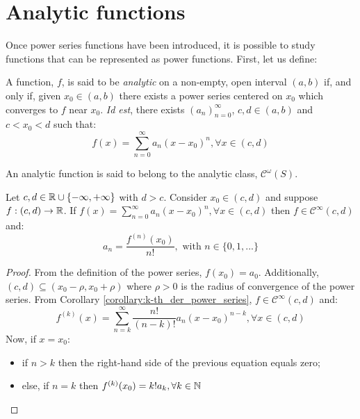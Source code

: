 \section{Analytic functions}

Once power series functions have been introduced, it is possible to study functions that can be represented as power functions. First, let us define:

\begin{definition}
    A function, $f$, is said to be \emph{analytic} on a non-empty, open interval $(a,b)$ if, and only if, given $x_0 \in (a,b)$ there exists a power series centered on $x_0$ which converges to $f$ near $x_0$. \emph{Id est}, there exists $(a_n)_{n=0}^\infty$, $c, d \in (a,b)$ and $c < x_0 < d$ such that:
    \begin{equation*}
        f(x) = \sum \limits_{n=0}^\infty a_n (x - x_0)^n, \forall x \in (c,d)
    \end{equation*}
\end{definition}

\begin{remark}
    An analytic function is said to belong to the analytic class, $\mathcal{C}^\omega(S)$.
\end{remark}

\begin{theorem}[Uniqueness]
    \label{theorem:uniqueness_power_series}
    Let $c, d \in \mathbb{R} \cup \{-\infty, +\infty\}$ with $d > c$. Consider $x_0 \in (c, d)$ and suppose $f: (c,d) \to \mathbb{R}$. If $f(x) = \sum_{n=0}^\infty a_n (x - x_0)^n, \forall x \in (c, d)$ then $f \in \mathcal{C}^\infty(c,d)$ and:
    \begin{equation*}
        a_n = \frac{f^{(n)}(x_0)}{n!}, \text{ with } n \in \{0, 1, ...\}
    \end{equation*}
\end{theorem}

\begin{proof}
    From the definition of the power series, $f(x_0) = a_0$. Additionally, $(c,d) \subseteq (x_0 - \rho, x_0 + \rho)$ where $\rho > 0$ is the radius of convergence of the power series. From Corollary \ref{corollary:k-th_der_power_series}, $f \in \mathcal{C}^\infty(c,d)$ and:
    \begin{equation*}
        f^{(k)}(x) = \sum \limits_{n=k}^\infty \frac{n!}{(n-k)!}a_n (x - x_0)^{n-k}, \forall x \in (c,d)
    \end{equation*}
    Now, if $x = x_0$:
    \begin{itemize}
        \item if $n > k$ then the right-hand side of the previous equation equals zero;
        \item else, if $n = k$ then $f^{(k)}(x_0) = k! a_k, \forall k \in \mathbb{N}$
    \end{itemize}
\end{proof}



